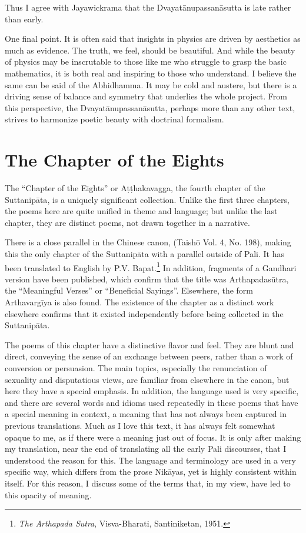 \documentclass[12pt,openany]{book}%
\newcommand*{\langlzh}[1]{\cjk{#1}\normalfont}%
\begin{document}
Thus I agree with Jayawickrama that the \textsanskrit{Dvayatānupassanāsutta} is late rather than early.

One final point. It is often said that insights in physics are driven by aesthetics as much as evidence. The truth, we feel, should be beautiful. And while the beauty of physics may be inscrutable to those like me who struggle to grasp the basic mathematics, it is both real and inspiring to those who understand. I believe the same can be said of the Abhidhamma. It may be cold and austere, but there is a driving sense of balance and symmetry that underlies the whole project. From this perspective, the \textsanskrit{Dvayatānupassanāsutta}, perhaps more than any other text, strives to harmonize poetic beauty with doctrinal formalism.

\section*{The Chapter of the Eights}

The “Chapter of the Eights” or \textsanskrit{Aṭṭhakavagga}, the fourth chapter of the \textsanskrit{Suttanipāta}, is a uniquely significant collection. Unlike the first three chapters, the poems here are quite unified in theme and language; but unlike the last chapter, they are distinct poems, not drawn together in a narrative.

There is a close parallel in the Chinese canon, \langlzh{義足經} (Taishō Vol. 4, No. 198), making this the only chapter of the \textsanskrit{Suttanipāta} with a parallel outside of Pali. It has been translated to English by P.V. Bapat.\footnote{\textit{The Arthapada Sutra}, Visva-Bharati, Santiniketan, 1951. } In addition, fragments of a Gandhari version have been published, which confirm that the title was \textsanskrit{Arthapadasūtra}, the “Meaningful Verses” or “Beneficial Sayings”. Elsewhere, the form \textsanskrit{Arthavargīya} is also found. The existence of the chapter as a distinct work elsewhere confirms that it existed independently before being collected in the \textsanskrit{Suttanipāta}.

The poems of this chapter have a distinctive flavor and feel. They are blunt and direct, conveying the sense of an exchange between peers, rather than a work of conversion or persuasion. The main topics, especially the renunciation of sexuality and disputatious views, are familiar from elsewhere in the canon, but here they have a special emphasis. In addition, the language used is very specific, and there are several words and idioms used repeatedly in these poems that have a special meaning in context, a meaning that has not always been captured in previous translations. Much as I love this text, it has always felt somewhat opaque to me, as if there were a meaning just out of focus. It is only after making my translation, near the end of translating all the early Pali discourses, that I understood the reason for this. The language and terminology are used in a very specific way, which differs from the prose \textsanskrit{Nikāyas}, yet is highly consistent within itself. For this reason, I discuss some of the terms that, in my view, have led to this opacity of meaning.
\end{document}
